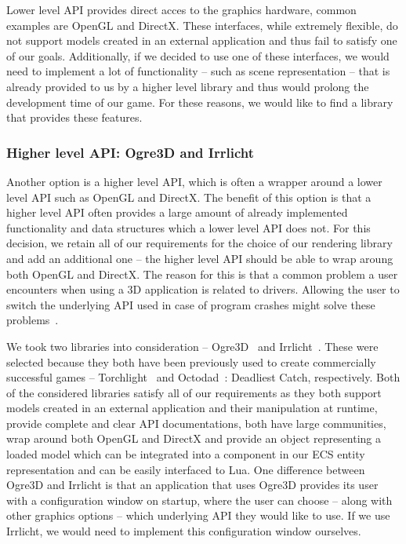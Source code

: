 Lower level API provides direct acces to the graphics hardware, common examples are OpenGL and DirectX. These interfaces, while
extremely flexible, do not support models created in an external application and thus fail to satisfy one of our goals. Additionally,
if we decided to use one of these interfaces, we would need to implement a lot of functionality -- such as scene representation -- that 
is already provided to us by a higher level library and thus would prolong the development time of our game. For these reasons, we would
like to find a library that provides these features.

\subsubsection{Higher level API: Ogre3D and Irrlicht}

Another option is a higher level API, which is often a wrapper around
a lower level API such as OpenGL and DirectX. The benefit of this option is that a higher level API often provides a large amount
of already implemented functionality and data structures which a lower level API does not. For this decision, we retain all of our
requirements for the choice of our rendering
library and add an additional one -- the higher level API should be able to wrap aroung both OpenGL and DirectX. The reason for this is
that a common problem a user encounters when using a 3D application is related to drivers. Allowing the user to switch the underlying
API used in case of program crashes might solve these problems~\cite{BothOpenGLAndDirectX}.

We took two libraries into consideration -- Ogre3D~\cite{Ogre3D} and Irrlicht~\cite{Irrlicht}. These were selected because they both have
been previously used to create commercially successful games -- Torchlight~\cite{Torchlight} and Octodad~\cite{Octodad}: Deadliest Catch, 
respectively.
Both of the considered libraries satisfy all of our requirements as they both
support models created in an external application and their manipulation at runtime, provide complete and clear API documentations,
both have large communities, wrap around both OpenGL and DirectX and provide an object representing a loaded model which can be
integrated into a component in our ECS entity representation and can be easily interfaced to Lua. One difference between Ogre3D and Irrlicht
is that an application that uses Ogre3D provides its user with a configuration window on startup, where the user can choose -- along with
other graphics options -- which underlying API they would like to use. If we use Irrlicht, we would need to implement this configuration
window ourselves.

